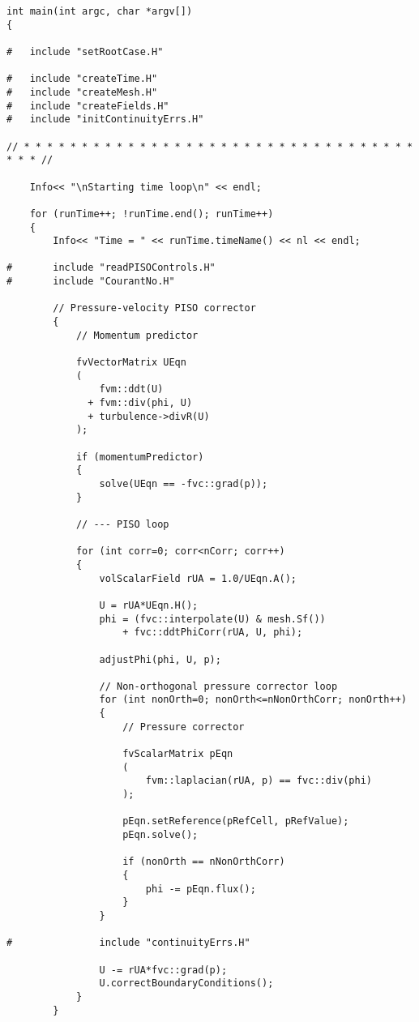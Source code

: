 \begin{OFfile}
\begin{verbatim}
int main(int argc, char *argv[])
{

#   include "setRootCase.H"

#   include "createTime.H"
#   include "createMesh.H"
#   include "createFields.H"
#   include "initContinuityErrs.H"

// * * * * * * * * * * * * * * * * * * * * * * * * * * * * * * * * * * * * * //

    Info<< "\nStarting time loop\n" << endl;

    for (runTime++; !runTime.end(); runTime++)
    {
        Info<< "Time = " << runTime.timeName() << nl << endl;

#       include "readPISOControls.H"
#       include "CourantNo.H"

        // Pressure-velocity PISO corrector
        {
            // Momentum predictor

            fvVectorMatrix UEqn
            (
                fvm::ddt(U)
              + fvm::div(phi, U)
              + turbulence->divR(U)
            );

            if (momentumPredictor)
            {
                solve(UEqn == -fvc::grad(p));
            }

            // --- PISO loop

            for (int corr=0; corr<nCorr; corr++)
            {
                volScalarField rUA = 1.0/UEqn.A();

                U = rUA*UEqn.H();
                phi = (fvc::interpolate(U) & mesh.Sf())
                    + fvc::ddtPhiCorr(rUA, U, phi);

                adjustPhi(phi, U, p);

                // Non-orthogonal pressure corrector loop
                for (int nonOrth=0; nonOrth<=nNonOrthCorr; nonOrth++)
                {
                    // Pressure corrector

                    fvScalarMatrix pEqn
                    (
                        fvm::laplacian(rUA, p) == fvc::div(phi)
                    );

                    pEqn.setReference(pRefCell, pRefValue);
                    pEqn.solve();

                    if (nonOrth == nNonOrthCorr)
                    {
                        phi -= pEqn.flux();
                    }
                }

#               include "continuityErrs.H"

                U -= rUA*fvc::grad(p);
                U.correctBoundaryConditions();
            }
        }


\end{verbatim}
\end{OFfile}
